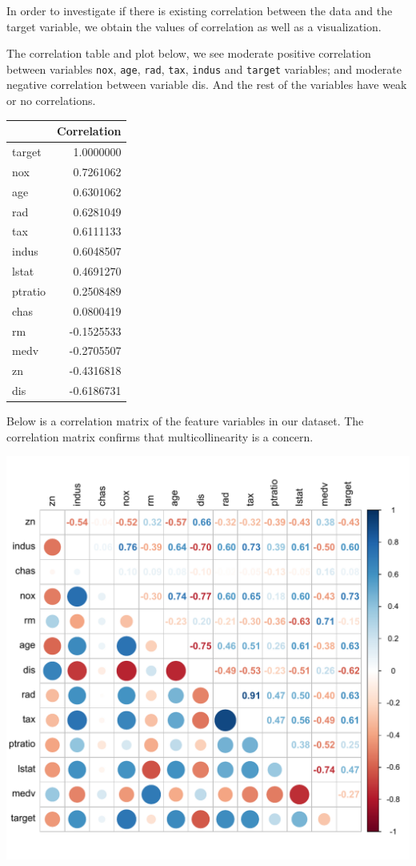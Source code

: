 \documentclass[3p]{elsarticle} %
\begin{document}
In order to investigate if there is existing correlation between the
data and the target variable, we obtain the values of correlation as
well as a visualization.

\newpage

The correlation table and plot below, we see moderate positive
correlation between variables \texttt{nox}, \texttt{age}, \texttt{rad},
\texttt{tax}, \texttt{indus} and \texttt{target} variables; and moderate
negative correlation between variable dis. And the rest of the variables
have weak or no correlations.

\begin{table}[H]
\centering
\begin{tabular}{l|r}
\hline
  & Correlation\\
\hline
target & 1.0000000\\
\hline
nox & 0.7261062\\
\hline
age & 0.6301062\\
\hline
rad & 0.6281049\\
\hline
tax & 0.6111133\\
\hline
indus & 0.6048507\\
\hline
lstat & 0.4691270\\
\hline
ptratio & 0.2508489\\
\hline
chas & 0.0800419\\
\hline
rm & -0.1525533\\
\hline
medv & -0.2705507\\
\hline
zn & -0.4316818\\
\hline
dis & -0.6186731\\
\hline
\end{tabular}
\end{table}

Below is a correlation matrix of the feature variables in our dataset.
The correlation matrix confirms that multicollinearity is a concern.

\includegraphics{paper_files/figure-latex/cor-matrix-1.pdf}
\end{document}
